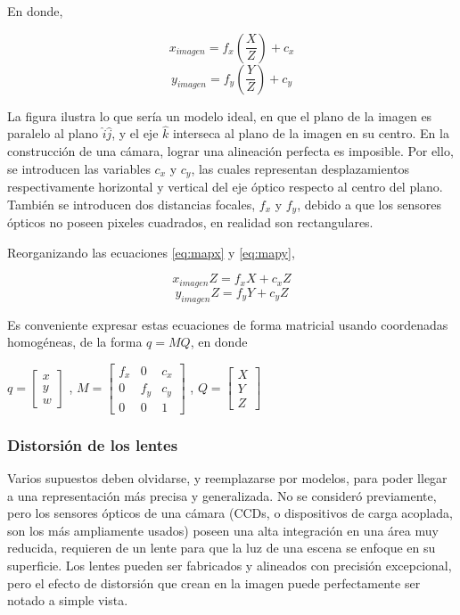 \documentclass[12pt]{article}
\begin{document}
    En donde,

\begin{equation} \label{eq:mapx}
    x_{imagen} = f_x\left(\frac{X}{Z}\right)+c_x
\end{equation}\begin{equation} \label{eq:mapy}
    y_{imagen} = f_y\left(\frac{Y}{Z}\right)+c_y
\end{equation}

    La figura ilustra lo que sería un modelo ideal, en que el plano de la
imagen es paralelo al plano \(\hat{i}\hat{j}\), y el eje \(\hat{k}\)
interseca al plano de la imagen en su centro. En la construcción de una
cámara, lograr una alineación perfecta es imposible. Por ello, se
introducen las variables \(c_x\) y \(c_y\), las cuales representan
desplazamientos respectivamente horizontal y vertical del eje óptico
respecto al centro del plano. También se introducen dos distancias
focales, \(f_x\) y \(f_y\), debido a que los sensores ópticos no poseen
pixeles cuadrados, en realidad son rectangulares.

    Reorganizando las ecuaciones \ref{eq:mapx} y \ref{eq:mapy},

    \[x_{imagen} Z = f_x X + c_x Z\] \[y_{imagen} Z = f_y Y + c_y Z\]

    Es conveniente expresar estas ecuaciones de forma matricial usando
coordenadas homogéneas, de la forma \(q = MQ\), en donde

    \(q = \begin{bmatrix} x \\[0.3em] y \\[0.3em] w \end{bmatrix}\) ,
\(M = \begin{bmatrix} f_x & 0 & c_x \\[0.3em] 0 & f_y & c_y \\[0.3em] 0 & 0 & 1 \end{bmatrix}\)
, \(Q = \begin{bmatrix} X \\[0.3em] Y \\[0.3em] Z \end{bmatrix}\)

    \subsubsection{Distorsión de los
lentes}\label{distorsiuxf3n-de-los-lentes}

    Varios supuestos deben olvidarse, y reemplazarse por modelos, para poder
llegar a una representación más precisa y generalizada. No se consideró
previamente, pero los sensores ópticos de una cámara (CCDs, o
dispositivos de carga acoplada, son los más ampliamente usados) poseen
una alta integración en una área muy reducida, requieren de un lente
para que la luz de una escena se enfoque en su superficie. Los lentes
pueden ser fabricados y alineados con precisión excepcional, pero el
efecto de distorsión que crean en la imagen puede perfectamente ser
notado a simple vista.
\end{document}
